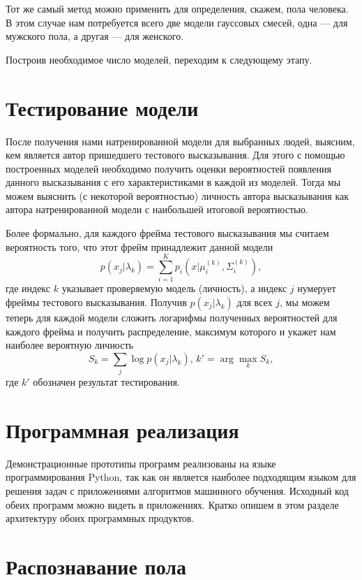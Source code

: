 \documentclass{gost-7-32}
\begin{document}
Тот же самый метод можно применить для определения, скажем, пола человека.
В этом случае нам потребуется всего две модели гауссовых смесей, одна --- для мужского пола, а другая --- для женского.

Построив необходимое число моделей, переходим к следующему этапу.

\newpage
\section{Тестирование модели}

После получения нами натренированной модели для выбранных людей, выясним, кем является автор пришедшего тестового высказывания.
Для этого с помощью построенных моделей необходимо получить оценки вероятностей появления данного высказывания с его характеристиками в каждой из моделей.
Тогда мы можем выяснить (с некоторой вероятностью) личность автора высказывания как автора натренированной модели с наибольшей итоговой вероятностью.

Более формально, для каждого фрейма тестового высказывания мы считаем вероятность того, что этот фрейм принадлежит данной модели
\begin{equation}
    p(x_j | \lambda_k) = \sum_{i = 1}^K p_i(x | \mu_i^{(k)}, \Sigma_i^{(k)}),
\end{equation}
где индекс $k$ указывает проверяемую модель (личность), а индекс $j$ нумерует фреймы тестового высказывания.
Получив $p(x_j | \lambda_k)$ для всех $j$, мы можем теперь для каждой модели сложить логарифмы полученных вероятностей для каждого фрейма и получить распределение, максимум которого и укажет нам наиболее вероятную личность
\begin{equation}
    S_k = \sum_j \log p(x_j | \lambda_k) \text{, } k' = \arg \max_k S_k,
\end{equation}
где $k'$ обозначен результат тестирования.

\section{Программная реализация}

Демонстрационные прототипы программ реализованы на языке программирования Python, так как он является наиболее подходящим языком для решения задач с приложениями алгоритмов машинного обучения.
Исходный код обеих программ можно видеть в приложениях.
Кратко опишем в этом разделе архитектуру обоих программных продуктов.

\newpage
\section{Распознавание пола}
\end{document}
